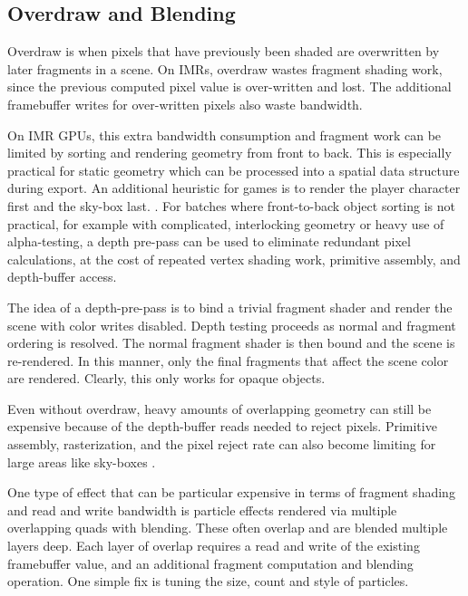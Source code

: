 \subsection{Overdraw and Blending}\label{Jon-McCaffrey-Overdraw-And-Blending}
 Overdraw is when pixels
that have previously been shaded are overwritten by later fragments in a scene.
On IMRs, overdraw wastes fragment shading work, since the previous computed
pixel value is over-written and lost.  The additional framebuffer writes for
over-written pixels also waste bandwidth.

On IMR GPUs, this extra bandwidth consumption and fragment work can be limited
by sorting and rendering geometry from front to back.  This is especially
practical for static geometry which can be processed into a spatial data
structure during export.  An additional heuristic for games is to render the
player character first and the sky-box last.  \cite{fast_mobile_shaders}.  For
batches where front-to-back object sorting is not practical, for example with
complicated, interlocking geometry or heavy use of alpha-testing, a depth
pre-pass can be used to eliminate redundant pixel calculations, at the cost of
repeated vertex shading work, primitive assembly, and depth-buffer access.

The idea of a depth-pre-pass is to bind a trivial fragment shader and render
the scene with color writes disabled.  Depth testing proceeds as normal and
fragment ordering is resolved.  The normal fragment shader is then bound and
the scene is re-rendered.  In this manner, only the final fragments that affect
the scene color are rendered.  Clearly, this only works for opaque objects.

Even without overdraw, heavy amounts of overlapping geometry can still be
expensive because of the depth-buffer reads needed to reject pixels.  Primitive
assembly, rasterization, and the pixel reject rate can also become limiting for
large areas like sky-boxes \cite{fast_mobile_shaders}.

One type of effect that can be particular expensive in terms of fragment
shading and read and write bandwidth is particle effects rendered via multiple
overlapping quads with blending.  These often overlap and are blended multiple
layers deep.  Each layer of overlap requires a read and write of the existing
framebuffer value, and an additional fragment computation and blending
operation.  One simple fix is tuning the size, count and style of particles.

